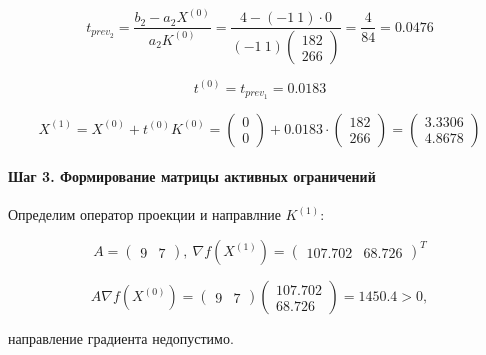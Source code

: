 \begin{equation*}
	t_{prev_2} = \frac{b_2 - a_2 X^{(0)}}{a_2 K^{(0)}} = \frac{4 - (-1\ 1) \cdot 0}{(-1\ 1) \begin{pmatrix} 182 \\ 266 \end{pmatrix}} = \frac{4}{84} = 0.0476
\end{equation*}

\begin{equation*}
	t^{(0)} = t_{prev_1} = 0.0183
\end{equation*}

\begin{equation*}
	X^{(1)} = X^{(0)} + t^{(0)} K^{(0)} = \begin{pmatrix}
		0 \\ 0 
	\end{pmatrix}
	+
	0.0183 \cdot \begin{pmatrix}
		182 \\ 266 
	\end{pmatrix}
	=
	\begin{pmatrix}
		3.3306 \\ 4.8678 
	\end{pmatrix}
\end{equation*}

\paragraph{Шаг 3. Формирование матрицы активных ограничений}

Определим оператор проекции и направлние $K^{(1)}$:

\begin{equation*}
	A = \begin{pmatrix} 9 & 7 \end{pmatrix},\ %
	\nabla f(X^{(1)}) = \begin{pmatrix} 107.702 & 68.726 \end{pmatrix}^T
\end{equation*}

\begin{equation*}
	A \nabla f(X^{(0)}) = \begin{pmatrix} 9 & 7 \end{pmatrix}
	\begin{pmatrix} 107.702 \\ 68.726 \end{pmatrix}
	=
	1450.4
	> 0,
\end{equation*}

направление градиента недопустимо.

